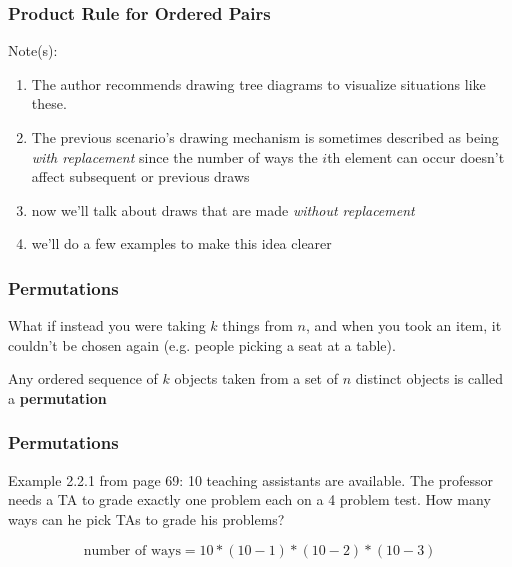 \documentclass{beamer}
\begin{document}


\begin{frame}
\frametitle{Product Rule for Ordered Pairs}

Note(s):
\begin{enumerate}
\item The author recommends drawing tree diagrams to visualize situations like these.
\item The previous scenario's drawing mechanism is sometimes described as being \emph{with replacement} since the number of ways the $i$th element can occur doesn't affect subsequent or previous draws
\item now we'll talk about draws that are made \emph{without replacement}
\item we'll do a few examples to make this idea clearer
\end{enumerate}


\end{frame}



\begin{frame}
\frametitle{Permutations}

What if instead you were taking $k$ things from $n$, and when you took an item, it couldn't be chosen again (e.g. people picking a seat at a table). 
\newline

Any ordered sequence of $k$ objects taken from a set of $n$ distinct objects is called a \textbf{permutation}

\end{frame}



\begin{frame}
\frametitle{Permutations}

Example 2.2.1 from page 69: 10 teaching assistants are available. The professor needs a TA to grade exactly one problem each on a 4 problem test. How many ways can he pick TAs to grade his problems?

\[
\text{number of ways} = 10 * (10 - 1) * (10 - 2) * (10 - 3)
\]
\end{frame}

\end{document}
